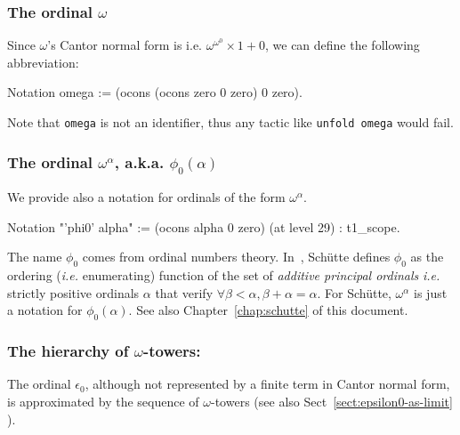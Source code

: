 \subsubsection{The ordinal \(\omega\)}
\label{sec:orgheadline68}

  Since \(\omega\)'s Cantor normal form is
i.e. \(\omega^{\omega^0}\times 1+ 0\), we can define the following abbreviation:

\label{sect:omega-notation2}
\begin{Coqsrc}
Notation omega := (ocons (ocons zero 0 zero) 0 zero).
\end{Coqsrc}

Note that \texttt{omega} is not an identifier, thus any tactic like \texttt{unfold omega} would fail.


\subsubsection{The ordinal \(\omega^\alpha\), a.k.a. \(\phi_0(\alpha)\)}
\label{sect:notation-phi0}
We provide also a notation for ordinals of the form $\omega^\alpha$.


\begin{Coqsrc}
Notation "'phi0' alpha" := (ocons alpha 0 zero) (at level 29) : t1_scope.
\end{Coqsrc}


\begin{remark}
\label{sec:orgheadline69}
The name \(\phi_0\)
   comes from ordinal numbers theory. In~\cite{schutte}, Schütte defines 
$\phi_0$  as the ordering (\emph{i.e.} enumerating) function of the set  of \emph{additive principal ordinals} \emph{i.e.} strictly positive ordinals $\alpha$ that verify $\forall \beta<\alpha, \beta+\alpha=\alpha$. For Schütte,  $\omega^\alpha$ is just a notation for $\phi_0(\alpha)$.  See also Chapter~\ref{chap:schutte} of this document.
\end{remark}



  
\subsubsection{The hierarchy of \(\omega\)-towers:}
\label{sec:orgheadline71}

The ordinal $\epsilon_0$, although not represented by a finite term in Cantor normal form, is approximated by the sequence of $\omega$-towers (see also Sect~\vref{sect:epsilon0-as-limit} ).

